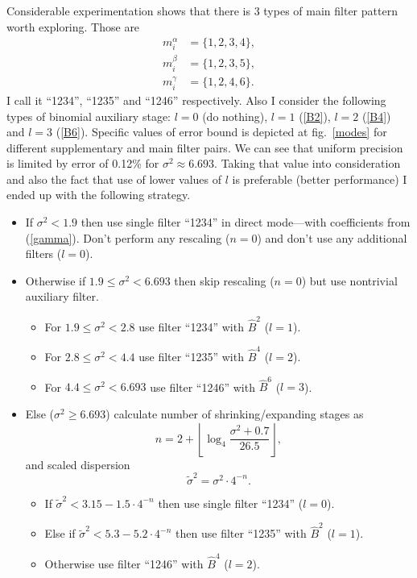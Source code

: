 \documentclass[10pt]{article}
\begin{document}
Considerable experimentation shows that there is 3 types of main filter pattern worth exploring.
Those are
\begin{align}
    m^\alpha_i &= \{1, 2, 3, 4\},\\
    m^\beta_i  &= \{1, 2, 3, 5\},\\
    m^\gamma_i &= \{1, 2, 4, 6\}.
\end{align}
I call it ``1234'', ``1235'' and ``1246'' respectively. Also I consider the following types of
binomial auxiliary stage: $l = 0$ (do nothing), $l = 1$ (\ref{B2}), $l = 2$ (\ref{B4}) and $l = 3$
(\ref{B6}). Specific values of error bound is depicted at fig.~\ref{modes} for different
supplementary and main filter pairs. We can see that uniform precision is limited by error of 0.12\%
for $\sigma^2 \approx 6.693$. Taking that value into consideration and also the fact that use of
lower values of $l$ is preferable (better performance) I ended up with the following strategy.
\begin{itemize}
    \item If $\sigma^2 < 1.9$ then use single filter ``1234'' in direct mode---with coefficients
        from (\ref{gamma}). Don't perform any rescaling ($n = 0$) and don't use any additional
        filters ($l = 0$).
    \item Otherwise if $1.9 \le \sigma^2 < 6.693$ then skip rescaling ($n = 0$) but use nontrivial
        auxiliary filter.
        \begin{itemize}
            \item For $1.9 \le \sigma^2 < 2.8$   use filter ``1234'' with $\hat B^2$ ($l = 1$).
            \item For $2.8 \le \sigma^2 < 4.4$   use filter ``1235'' with $\hat B^4$ ($l = 2$).
            \item For $4.4 \le \sigma^2 < 6.693$ use filter ``1246'' with $\hat B^6$ ($l = 3$).
        \end{itemize}
    \item Else ($\sigma^2 \ge 6.693$) calculate number of shrinking/expanding stages as
        \begin{equation}
            n = 2 + \left\lfloor\log_4\frac{\sigma^2 + 0.7}{26.5}\right\rfloor,
        \end{equation}
        and scaled dispersion
        \begin{equation}
            \tilde\sigma^2 = \sigma^2\cdot4^{-n}.
        \end{equation}
        \begin{itemize}
            \item If $\tilde\sigma^2 < 3.15 - 1.5\cdot4^{-n}$ then
                use single filter ``1234'' ($l = 0$).
            \item Else if $\tilde\sigma^2 < 5.3 - 5.2\cdot4^{-n}$ then
                use filter ``1235'' with $\hat B^2$ ($l = 1$).
            \item Otherwise use filter ``1246'' with $\hat B^4$ ($l = 2$).
        \end{itemize}
\end{itemize}
\end{document}
